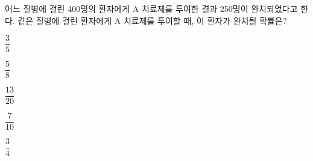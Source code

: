 어느 질병에 걸린 400명의 환자에게 $\mathrm{A}$ 치료제를 투여한 결과 250명이 완치되었다고 한다. 같은 질병에 걸린 환자에게 $\mathrm{A}$ 치료제를 투여할 때, 이 환자가 완치될 확률은?
\begin{choicesii}{\rule[-3ex]{0pt}{8ex}$\dfrac{3}{5}$}{\rule[-3ex]{0pt}{8ex}$\dfrac{5}{8}$}{\rule[-3ex]{0pt}{8ex}$\dfrac{13}{20}$}{\rule[-3ex]{0pt}{8ex}$\dfrac{7}{10}$}{\rule[-3ex]{0pt}{8ex}$\dfrac{3}{4}$}\end{choicesii}
